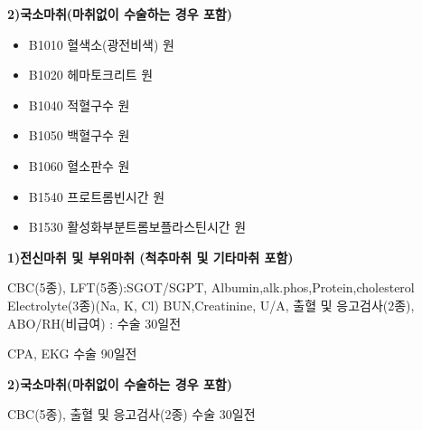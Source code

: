 {\textbf{2)국소마취(마취없이 수술하는 경우 포함)} \par
\begin{itemize}\tightlist
\item[\dschemical] B1010 혈색소(광전비색)  원
\item[\dschemical] B1020 헤마토크리트  원
\item[\dschemical] B1040 적혈구수  원
\item[\dschemical] B1050 백혈구수  원
\item[\dschemical] B1060 혈소판수  원
\item[\dschemical] B1540 프로트롬빈시간  원
\item[\dschemical] B1530 활성화부분트롬보플라스틴시간  원
\end{itemize}
}
{
\Large \textbf{1)전신마취 및 부위마취 (척추마취 및 기타마취 포함)}\normalsize \par
CBC(5종), LFT(5종):SGOT/SGPT, Albumin,alk.phos,Protein,cholesterol
Electrolyte(3종)(Na, K, Cl)
BUN,Creatinine, U/A, 출혈 및 응고검사(2종), ABO/RH(비급여) : 수술 30일전 \par
CPA, EKG 수술 90일전 \par
\Large \textbf{2)국소마취(마취없이 수술하는 경우 포함)}\normalsize \par
CBC(5종), 출혈 및 응고검사(2종) 수술 30일전
}